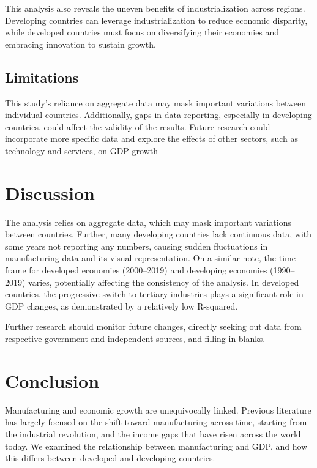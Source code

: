 \documentclass[12pt]{article}
\begin{document}
This analysis also reveals the uneven benefits of industrialization across regions. Developing countries can leverage industrialization to reduce economic disparity, while developed countries must focus on diversifying their economies and embracing innovation to sustain growth.

\subsection{Limitations}

This study’s reliance on aggregate data may mask important variations between individual countries. Additionally, gaps in data reporting, especially in developing countries, could affect the validity of the results. Future research could incorporate more specific data and explore the effects of other sectors, such as technology and services, on GDP growth

\section{Discussion}
\label{sec:discussion}


The analysis relies on aggregate data, which may mask important variations between countries. Further, many developing countries lack continuous data, with some years not reporting any numbers, causing sudden fluctuations in manufacturing data and its visual representation. On a similar note, the time frame for developed economies (2000–2019) and developing economies (1990–2019) varies, potentially affecting the consistency of the analysis.
In developed countries, the progressive switch to tertiary industries plays a significant role in GDP changes, as demonstrated by a relatively low R-squared.

Further research should monitor future changes, directly seeking out data from respective government and independent sources, and filling in blanks.


\section{Conclusion}
\label{sec:conclusion}

Manufacturing and economic growth are unequivocally linked. Previous literature has largely focused on the shift toward manufacturing across time, starting from the industrial revolution, and the income gaps that have risen across the world today.  We examined the relationship between manufacturing and GDP, and how this differs between developed and developing countries.
\end{document}
